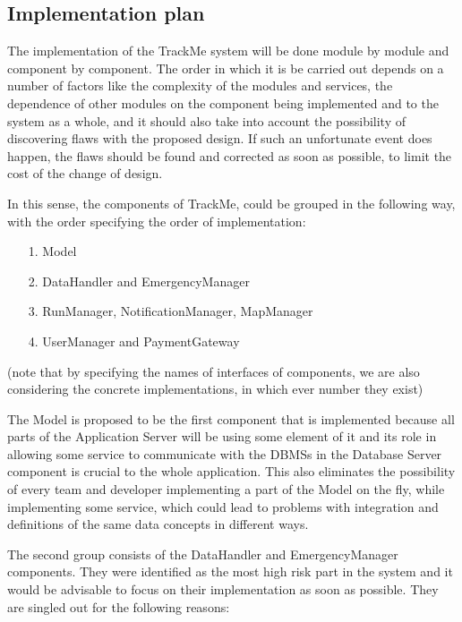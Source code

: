 
%

\subsection{Implementation plan}
The implementation of the TrackMe system will be done module by module and component by component. The order in which it is be carried out depends on a number of factors like the complexity of the modules and services, the dependence of other modules on the component being implemented and to the system as a whole, and it should also take into account the possibility of discovering flaws with the proposed design. If such an unfortunate event does happen, the flaws should be found and corrected as soon as possible, to limit the cost of the change of design. \newline

In this sense, the components of TrackMe, could be grouped in the following way, with the order specifying the order of implementation:
\begin{itemize}
\item[1.] Model
\item[2.] DataHandler and EmergencyManager
\item[3.] RunManager, NotificationManager, MapManager
\item[4.] UserManager and PaymentGateway
\end{itemize}

(note that by specifying the names of interfaces of components, we are also considering the concrete implementations, in which ever number they exist) \newline

The Model is proposed to be the first component that is implemented because all parts of the Application Server will be using some element of it and its role in allowing some service to communicate with the DBMSs in the Database Server component is crucial to the whole application. This also eliminates the possibility of every team and developer implementing a part of the Model on the fly, while implementing some service, which could lead to problems with integration and definitions of the same data concepts in different ways. \newline

The second group consists of the DataHandler and EmergencyManager components. They were identified as the most high risk part in the system and it would be advisable to focus on their implementation as soon as possible. They are singled out for the following reasons:


